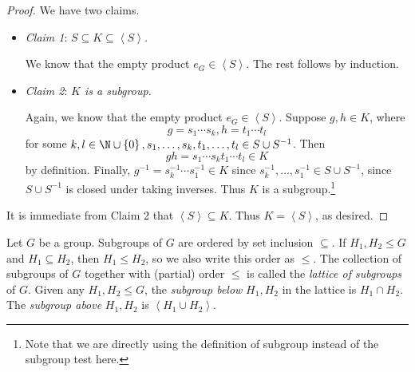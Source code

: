 \documentclass[pmath347]{subfiles}
\begin{document}
    \begin{proof}
        We have two claims.
        \begin{itemize}
            \item \textit{Claim 1}: \textit{$S\subseteq K\subseteq \left< S \right>$.}

                \begin{subproof}
                    We know that the empty product $e_G\in \left< S \right>$. The rest follows by induction.
                \end{subproof}

            \item \textit{Claim 2}: \textit{$K$ is a subgroup.}

                \begin{subproof}
                    Again, we know that the empty product $e_G\in \left< S \right>$. Suppose $g,h\in K$, where
                    \begin{equation*}
                        g = s_1\cdots s_k , h = t_1\cdots t_l
                    \end{equation*}
                    for some $k,l\in\N\cup\left\lbrace 0 \right\rbrace , s_1,\ldots,s_k,t_1,\ldots,t_l\in S\cup S^{-1} $. Then
                    \begin{equation*}
                        gh = s_1\cdots s_kt_1\cdots t_l\in K
                    \end{equation*}
                    by definition. Finally, $g^{-1} = s_k^{-1} \cdots s_1^{-1} \in K$ since $s_k^{-1} ,\ldots,s_1^{-1} \in S\cup S^{-1}$, since $S\cup S^{-1} $ is closed under taking inverses. Thus $K$ is a subgroup.\footnote{Note that we are directly using the definition of subgroup instead of the subgroup test here.} 
                \end{subproof}
        \end{itemize} 
        It is immediate from Claim 2 that $\left< S \right> \subseteq K$. Thus $K = \left< S \right>$, as desired.  
    \end{proof}

    Let $G$ be a group. Subgroups of $G$ are ordered by set inclusion $\subseteq$. If $H_1,H_2\leq G$ and $H_1\subseteq H_2$, then $H_1\leq H_2$, so we also write this order as $\leq$. The collection of subgroups of $G$ together with (partial) order $\leq$ is called the \emph{lattice of subgroups} of $G$. Given any $H_1,H_2\leq G$, the \emph{subgroup below} $H_1,H_2$ in the lattice is $H_1\cap H_2$. The \emph{subgroup above} $H_1,H_2$ is $\left< H_1\cup H_2 \right>$.  
\end{document}
